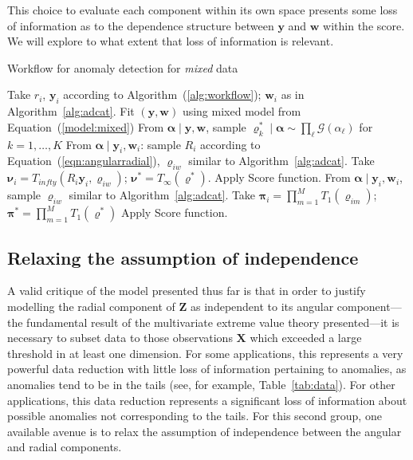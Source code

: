     This choice to evaluate each component within its own space presents some 
    loss of information as to the dependence structure between $\bm{y}$ and 
    $\bm{w}$ within the score.  We will explore to what extent that loss of 
    information is relevant.

\begin{algorithm}[htb]
    \caption{Workflow for anomaly detection for \emph{mixed} data}\label{alg:admixed}
    \begin{algorithmic}[1]
        \State Take $r_i$, $\bm{y}_i$ according to Algorithm~(\ref{alg:workflow}); $\bm{w}_i$ as in Algorithm~\ref{alg:adcat}.
        \State Fit $(\bm{y},\bm{w})$ using mixed model from Equation~(\ref{model:mixed})
        \State From $\bm{\alpha}\mid\bm{y},\bm{w}$, sample
            $\bm{\varrho}_k^{*}\mid\bm{\alpha}\sim\prod_{\ell}\mathcal{G}(\alpha_{\ell})$ for $k = 1,\ldots,K$
            \State From $\bm{\alpha}\mid\bm{y}_i,\bm{w}_i$:
                sample $R_i$ according to Equation~(\ref{eqn:angularradial}), 
                $\bm{\varrho}_{iw}$ similar to Algorithm~\ref{alg:adcat}.
            \State Take $\bm{\nu}_i = T_{infty}(R_i\bm{y}_i,\bm{\varrho}_{iw})$;      
                $\bm{\nu}^* = T_{\infty}(\bm{\varrho}^*)$.
            \State Apply Score function.
            \State From $\bm{\alpha}\mid\bm{y}_i,\bm{w}_i$, 
                sample $\bm{\varrho}_{iw}$ similar to Algorithm~\ref{alg:adcat}.
            \State Take $\bm{\pi}_i = \prod_{m = 1}^M T_{1}(\bm{\varrho}_{im})$;    
                $\bm{\pi}^* = \prod_{m = 1}^{M} T_1(\bm{\varrho}^*)$
            \State Apply Score function.
        \EndIf
    \end{algorithmic}
\end{algorithm}

\subsection{Relaxing the assumption of independence\label{subsec:rank}}
A valid critique of the model presented thus far is that in order to justify 
    modelling the radial component of $\bm{Z}$ as independent to its angular 
    component---the fundamental result of the multivariate extreme value theory 
    presented---it is necessary to subset data to those observations $\bm{X}$ which exceeded a large 
    threshold in at least one dimension.  For some applications, 
    this represents a very powerful data reduction with little loss of 
    information pertaining to anomalies, as anomalies tend to be in the tails 
    (see, for  example, Table~\ref{tab:data}).  For other applications, this 
    data reduction represents a significant loss of information about possible
    anomalies not corresponding to the tails.  For this second group,
    one available avenue is to relax the assumption of independence between the 
    angular and radial components.

